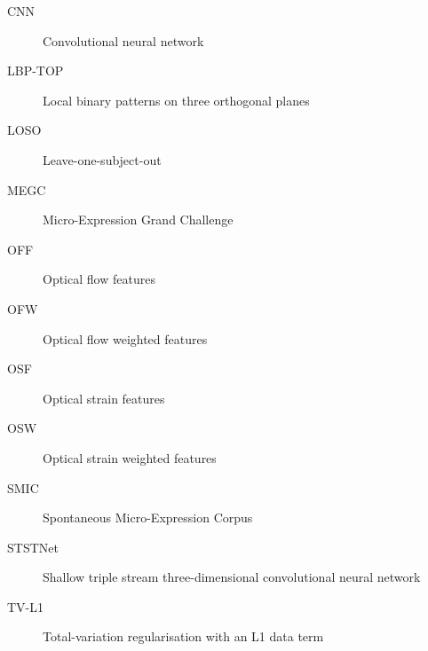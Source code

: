 \begin{description}
    \item[CNN] Convolutional neural network
    \item[LBP-TOP] Local binary patterns on three orthogonal planes
    \item[LOSO] Leave-one-subject-out
    \item[MEGC] Micro-Expression Grand Challenge
    \item[OFF] Optical flow features
    \item[OFW] Optical flow weighted features
    \item[OSF] Optical strain features
    \item[OSW] Optical strain weighted features
    \item[SMIC] Spontaneous Micro-Expression Corpus
    \item[STSTNet] Shallow triple stream three-dimensional convolutional neural network
    \item[TV-L1] Total-variation regularisation with an L1 data term
\end{description}
